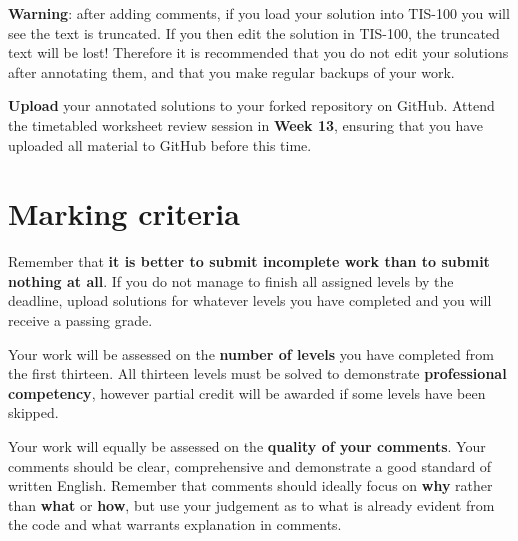 \documentclass{../../../fal_assignment}
\begin{document}
\textbf{Warning}: after adding comments, if you load your solution into TIS-100 you will see the text is truncated.
If you then edit the solution in TIS-100, the truncated text will be lost!
Therefore it is recommended that you do not edit your solutions after annotating them,
and that you make regular backups of your work.

\textbf{Upload} your annotated solutions to your forked repository on GitHub.
Attend the timetabled worksheet review session in \textbf{Week 13},
ensuring that you have uploaded all material to GitHub before this time.

\section*{Marking criteria}

Remember that \textbf{it is better to submit incomplete work than to submit nothing at all}.
If you do not manage to finish all assigned levels by the deadline, upload solutions for whatever levels you have completed
and you will receive a passing grade.

Your work will be assessed on the \textbf{number of levels} you have completed from the first thirteen.
All thirteen levels must be solved to demonstrate \textbf{professional competency},
however partial credit will be awarded if some levels have been skipped.

Your work will equally be assessed on the \textbf{quality of your comments}.
Your comments should be clear, comprehensive and demonstrate a good standard of written English.
Remember that comments should ideally focus on \textbf{why} rather than \textbf{what} or \textbf{how},
but use your judgement as to what is already evident from the code and what warrants explanation in comments.
\end{document}
